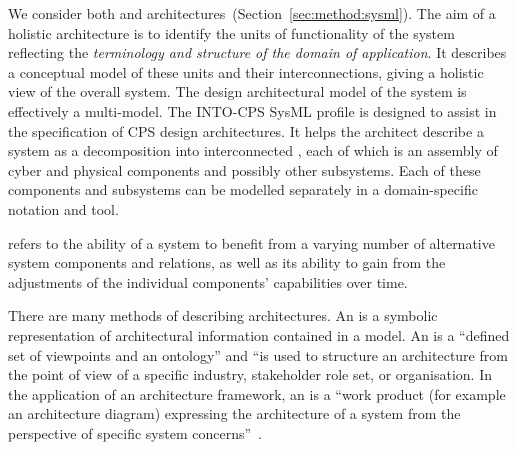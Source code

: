 We consider both  and  architectures~(Section~\ref{sec:method:sysml}). The aim of a holistic architecture is to identify the units of functionality of the system reflecting the \emph{terminology and structure of the domain of application}. It describes a conceptual model of these units and their interconnections, giving a holistic view of the overall system. The design architectural model of the system is effectively a multi-model. The INTO-CPS SysML profile is designed to assist in the specification of CPS design architectures. It helps the architect describe a system as a decomposition into interconnected , each of which is an assembly of cyber and physical components and possibly other subsystems. Each of these components and subsystems can be modelled separately in a domain-specific notation and tool.

 refers to the ability of a system to benefit from a varying number of alternative system components and relations, as well as its ability to gain from the adjustments of the individual components' capabilities over time.

There are many methods of describing architectures. An  is a symbolic representation of architectural information contained in a model. An  is a ``defined set of viewpoints and an ontology'' and ``is used to structure an architecture from the point of view of a specific industry, stakeholder role set, or organisation. In the application of an architecture framework, an  is a ``work product (for example an architecture diagram) expressing the architecture of a system from the perspective of specific system concerns''~\cite{COMPASSD22.6}.


